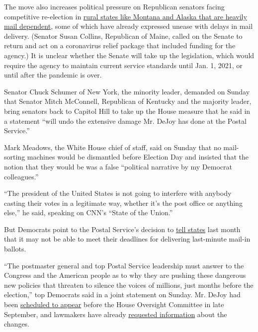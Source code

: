 The move also increases political pressure on Republican senators facing
competitive re-election in
\href{https://www.nytimes3xbfgragh.onion/2020/08/21/us/postal-service-mail-rural.html}{rural
states like Montana and Alaska that are heavily mail dependent}, some of
which have already expressed unease with delays in mail delivery.
(Senator Susan Collins, Republican of Maine, called on the Senate to
return and act on a coronavirus relief package that included funding for
the agency.) It is unclear whether the Senate will take up the
legislation, which would require the agency to maintain current service
standards until Jan. 1, 2021, or until after the pandemic is over.

Senator Chuck Schumer of New York, the minority leader, demanded on
Sunday that Senator Mitch McConnell, Republican of Kentucky and the
majority leader, bring senators back to Capitol Hill to take up the
House measure that he said in a statement ``will undo the extensive
damage Mr. DeJoy has done at the Postal Service.''

Mark Meadows, the White House chief of staff, said on Sunday that no
mail-sorting machines would be dismantled before Election Day and
insisted that the notion that they would be was a false ``political
narrative by my Democrat colleagues.''

``The president of the United States is not going to interfere with
anybody casting their votes in a legitimate way, whether it's the post
office or anything else,'' he said, speaking on CNN's ``State of the
Union.''

But Democrats point to the Postal Service's decision to
\href{https://www.nytimes3xbfgragh.onion/2020/08/14/us/politics/usps-vote-mail.html}{tell
states} last month that it may not be able to meet their deadlines for
delivering last-minute mail-in ballots.

``The postmaster general and top Postal Service leadership must answer
to the Congress and the American people as to why they are pushing these
dangerous new policies that threaten to silence the voices of millions,
just months before the election,'' top Democrats said in a joint
statement on Sunday. Mr. DeJoy had been
\href{https://oversight.house.gov/sites/democrats.oversight.house.gov/files/2020-08-03\%20CBM\%20to\%20DeJoy\%20-PMG\%20re\%20Witness\%20Invite.pdf}{scheduled
to appear} before the House Oversight Committee in late September, and
lawmakers have already
\href{https://oversight.house.gov/news/press-releases/pelosi-schumer-top-committee-democrats-press-postmaster-general-for-answers-on}{requested
information} about the changes.

